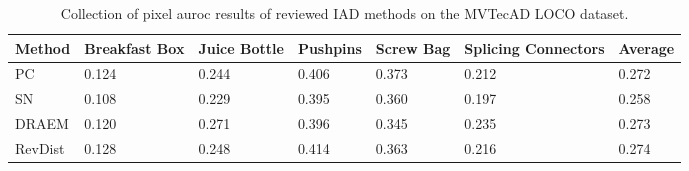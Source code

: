 \begin{table}[htbp]
    \tiny
    \centering
    \begin{tabularx}{\textwidth}{|X|X|X|X|X|X|X|}%
        \hline
        \textbf{Method} & \textbf{Breakfast Box} & \textbf{Juice Bottle} & \textbf{Pushpins} & \textbf{Screw Bag} & \textbf{Splicing Connectors} & \textbf{Average} \\
        \hline
        PC \cite{patchCore2022} & 0.124 & 0.244 & 0.406 & 0.373 & 0.212 & 0.272 \\
        \hline 
        SN \cite{liu2023simplenet} & 0.108 & 0.229 & 0.395 & 0.360 & 0.197 & 0.258 \\
        \hline
        DRAEM \cite{Zavrtanik_2021DRAEM} & 0.120 & 0.271 & 0.396 & 0.345 & 0.235 & 0.273 \\
        \hline
        RevDist \cite{revdist2023} & 0.128 & 0.248 & 0.414 & 0.363 & 0.216 & 0.274 \\
        \hline
    \end{tabularx}
    \caption{Collection of pixel auroc results of reviewed IAD methods on the MVTecAD LOCO \cite{LOCODentsAndScratchesBergmann2022} dataset.}
    \label{tab:sproloco}
\end{table}

